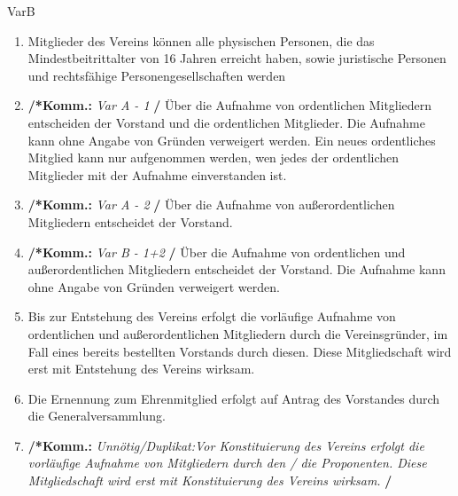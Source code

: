 \documentclass[a4paper,12pt]{article}
\newcommand{\comment}[1]{{\bf /*Komm.:} \textit{#1} {\bf */}}
\begin{document}
VarB
\begin{enumerate}
\item Mitglieder des Vereins können alle physischen Personen, die das Mindestbeitrittalter von 16 Jahren erreicht haben, sowie juristische Personen und rechtsfähige Personengesellschaften werden

\item \comment{Var A - 1} Über die Aufnahme von ordentlichen Mitgliedern entscheiden der Vorstand und die ordentlichen Mitglieder. Die Aufnahme kann ohne Angabe von Gründen verweigert werden.
Ein neues ordentliches Mitglied kann nur aufgenommen werden, wen jedes der ordentlichen Mitglieder mit der Aufnahme einverstanden ist.

\item \comment{Var A - 2} Über die Aufnahme von außerordentlichen Mitgliedern entscheidet der Vorstand.

\item \comment{Var B - 1+2} Über die Aufnahme von ordentlichen und außerordentlichen Mitgliedern entscheidet der Vorstand. Die Aufnahme kann ohne Angabe von Gründen verweigert werden.

\item Bis zur Entstehung des Vereins erfolgt die vorläufige Aufnahme von ordentlichen und außerordentlichen Mitgliedern durch die Vereinsgründer, im Fall eines bereits bestellten Vorstands durch diesen. Diese Mitgliedschaft wird erst mit Entstehung des Vereins wirksam.

\item  Die Ernennung zum Ehrenmitglied erfolgt auf Antrag des Vorstandes durch die Generalversammlung.

\item \comment{Unnötig/Duplikat:Vor Konstituierung des Vereins erfolgt die vorläufige Aufnahme von Mitgliedern durch den / die Proponenten. Diese Mitgliedschaft wird erst mit Konstituierung des Vereins wirksam.}

\end{enumerate}
\end{document}
